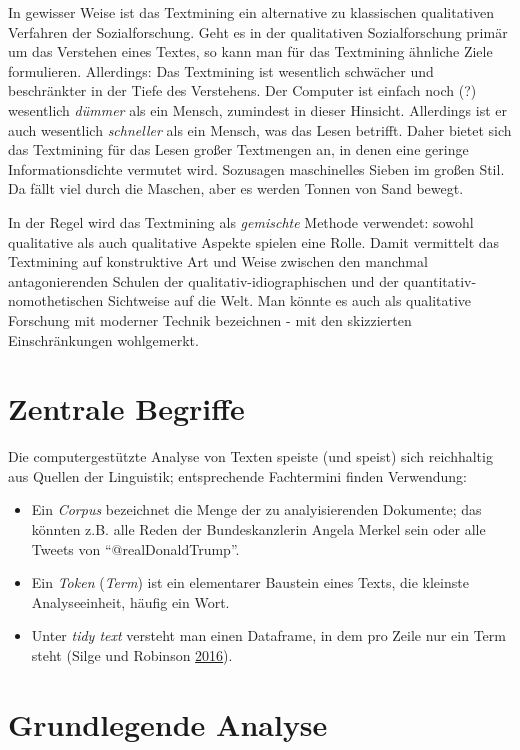 \documentclass[12pt,ngerman,]{book}
\theoremstyle{definition}
\theoremstyle{definition}
\theoremstyle{remark}
\begin{document}
In gewisser Weise ist das Textmining ein alternative zu klassischen
qualitativen Verfahren der Sozialforschung. Geht es in der qualitativen
Sozialforschung primär um das Verstehen eines Textes, so kann man für
das Textmining ähnliche Ziele formulieren. Allerdings: Das Textmining
ist wesentlich schwächer und beschränkter in der Tiefe des Verstehens.
Der Computer ist einfach noch (?) wesentlich \emph{dümmer} als ein
Mensch, zumindest in dieser Hinsicht. Allerdings ist er auch wesentlich
\emph{schneller} als ein Mensch, was das Lesen betrifft. Daher bietet
sich das Textmining für das Lesen großer Textmengen an, in denen eine
geringe Informationsdichte vermutet wird. Sozusagen maschinelles Sieben
im großen Stil. Da fällt viel durch die Maschen, aber es werden Tonnen
von Sand bewegt.

In der Regel wird das Textmining als \emph{gemischte} Methode verwendet:
sowohl qualitative als auch qualitative Aspekte spielen eine Rolle.
Damit vermittelt das Textmining auf konstruktive Art und Weise zwischen
den manchmal antagonierenden Schulen der qualitativ-idiographischen und
der quantitativ-nomothetischen Sichtweise auf die Welt. Man könnte es
auch als qualitative Forschung mit moderner Technik bezeichnen - mit den
skizzierten Einschränkungen wohlgemerkt.

\section{Zentrale Begriffe}\label{zentrale-begriffe}

Die computergestützte Analyse von Texten speiste (und speist) sich
reichhaltig aus Quellen der Linguistik; entsprechende Fachtermini finden
Verwendung:

\begin{itemize}
\item
  Ein \emph{Corpus} bezeichnet die Menge der zu analyisierenden
  Dokumente; das könnten z.B. alle Reden der Bundeskanzlerin Angela
  Merkel sein oder alle Tweets von ``@realDonaldTrump''.
\item
  Ein \emph{Token} (\emph{Term}) ist ein elementarer Baustein eines
  Texts, die kleinste Analyseeinheit, häufig ein Wort.
\item
  Unter \emph{tidy text} versteht man einen Dataframe, in dem pro Zeile
  nur ein Term steht (Silge und Robinson
  \protect\hyperlink{ref-Silge2016}{2016}).
\end{itemize}

\section{Grundlegende Analyse}\label{grundlegende-analyse}
\end{document}
